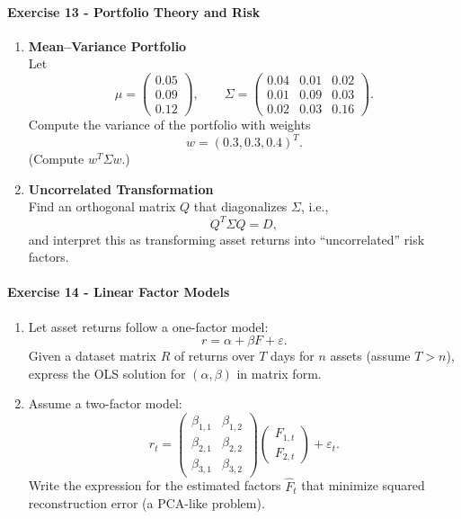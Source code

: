 \documentclass[11pt]{article}
\begin{document}
\paragraph{Exercise 13 - Portfolio Theory and Risk}
\begin{enumerate}
    \item \textbf{Mean–Variance Portfolio}\\
    Let
    \[
        \mu = \begin{pmatrix} 0.05 \\ 0.09 \\ 0.12 \end{pmatrix}, \qquad
        \Sigma =
        \begin{pmatrix}
            0.04 & 0.01 & 0.02 \\
            0.01 & 0.09 & 0.03 \\
            0.02 & 0.03 & 0.16
        \end{pmatrix}.
    \]
    Compute the variance of the portfolio with weights
    \[
        w = (0.3, 0.3, 0.4)^T.
    \]
    (Compute $w^T \Sigma w$.)

    \item \textbf{Uncorrelated Transformation}\\
    Find an orthogonal matrix $Q$ that diagonalizes $\Sigma$, i.e.,
    \[
        Q^T \Sigma Q = D,
    \]
    and interpret this as transforming asset returns into ``uncorrelated'' risk factors.

\end{enumerate}

\paragraph{Exercise 14 - Linear Factor Models}
\begin{enumerate}
    \item Let asset returns follow a one-factor model:
    \[
        r = \alpha + \beta F + \varepsilon.
    \]
    Given a dataset matrix $R$ of returns over $T$ days for $n$ assets (assume $T > n$), express the OLS solution for $(\alpha, \beta)$ in matrix form.

    \item Assume a two-factor model:
    \[
        r_t =
        \begin{pmatrix}
        \beta_{1,1} & \beta_{1,2} \\
        \beta_{2,1} & \beta_{2,2} \\
        \beta_{3,1} & \beta_{3,2}
        \end{pmatrix}
        \begin{pmatrix}
        F_{1,t} \\
        F_{2,t}
        \end{pmatrix}
        + \varepsilon_t.
    \]
    Write the expression for the estimated factors $\hat{F}_t$ that minimize squared reconstruction error (a PCA-like problem).
\end{enumerate}
\end{document}
